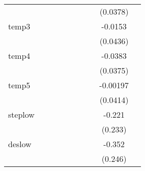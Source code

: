 {\begin{tabular}{l*{9}{c}}
            &                     &                     &                     &                     &                     &                     &                     &    (0.0378)         &                     \\
[1em]
temp3       &                     &                     &                     &                     &                     &                     &                     &     -0.0153         &                     \\
            &                     &                     &                     &                     &                     &                     &                     &    (0.0436)         &                     \\
[1em]
temp4       &                     &                     &                     &                     &                     &                     &                     &     -0.0383         &                     \\
            &                     &                     &                     &                     &                     &                     &                     &    (0.0375)         &                     \\
[1em]
temp5       &                     &                     &                     &                     &                     &                     &                     &    -0.00197         &                     \\
            &                     &                     &                     &                     &                     &                     &                     &    (0.0414)         &                     \\
[1em]
steplow     &                     &                     &                     &                     &                     &                     &                     &      -0.221         &                     \\
            &                     &                     &                     &                     &                     &                     &                     &     (0.233)         &                     \\
[1em]
deslow      &                     &                     &                     &                     &                     &                     &                     &      -0.352         &                     \\
            &                     &                     &                     &                     &                     &                     &                     &     (0.246)         &                     \\

\end{tabular}}
